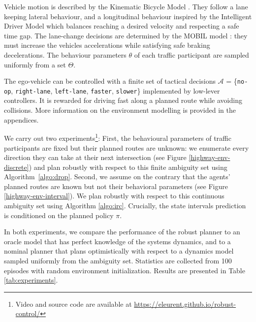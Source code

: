 \documentclass{article}
\DeclareMathOperator*{\cupdot}{\mathbin{\mathaccent\cdot\cup}}
\begin{document}
\vspace{-1mm}
Vehicle motion is described by the Kinematic Bicycle Model \citep[see, e.g.][]{Polack2017}. They follow a lane keeping lateral behaviour, and a longitudinal behaviour inspired by the Intelligent Driver Model \citep{Treiber2000} which balances reaching a desired velocity and respecting a safe time gap. The lane-change decisions are determined by the MOBIL model \citep{Kesting2007}: they must increase the vehicles accelerations while satisfying safe braking decelerations. The behaviour parameters $\theta$ of each traffic participant are sampled uniformly from a set $\Theta$.


\vspace{-1mm}
The ego-vehicle can be controlled with a finite set of tactical decisions $\mathcal{A}$ = \{\texttt{no-op}, \texttt{right-lane}, \texttt{left-lane}, \texttt{faster}, \texttt{slower}\} implemented by low-lever controllers. It is rewarded for driving fast along a planned route while avoiding collisions. More information on the environment modelling is provided in the appendices.


\vspace{-1mm}
We carry out two experiments\footnote{Video and source code are available at \href{https://eleurent.github.io/robust-control/}{https://eleurent.github.io/robust-control/}}:  First, the behavioural parameters of traffic participants are fixed but their planned routes are unknown: we enumerate every direction they can take at their next intersection (see Figure \ref{highway-env-discrete}) and plan robustly with respect to this finite ambiguity set using Algorithm~\ref{algo:drop}. Second, we assume on the contrary that the agents' planned routes are known but not their behavioral parameters (see Figure \ref{highway-env-interval}). We plan robustly with respect to this continuous ambiguity set using Algorithm \ref{algo:irc}. Crucially, the state intervals prediction is conditioned on the planned policy $\pi$.


\vspace{-1mm}
In both experiments, we compare the performance of the robust planner to an oracle model that has perfect knowledge of the systems dynamics, and to a nominal planner that plans optimistically with respect to a dynamics model sampled uniformly from the ambiguity set. Statistics are collected from 100 episodes with random environment initialization. Results are presented in Table \ref{tab:experiments}.

\end{document}
